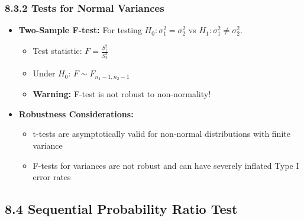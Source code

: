 \subsubsection{8.3.2 Tests for Normal Variances}

\begin{itemize}
	\item \textbf{Two-Sample F-test:} For testing $H_0: \sigma_1^2 = \sigma_2^2$ vs $H_1: \sigma_1^2 \neq \sigma_2^2$.
	\begin{itemize}
		\item Test statistic: $F = \frac{S_1^2}{S_2^2}$
		\item Under $H_0$: $F \sim F_{n_1-1, n_2-1}$
		\item \textbf{Warning:} F-test is not robust to non-normality!
	\end{itemize}
	\item \textbf{Robustness Considerations:}
	\begin{itemize}
		\item t-tests are asymptotically valid for non-normal distributions with finite variance
		\item F-tests for variances are not robust and can have severely inflated Type I error rates
	\end{itemize}
\end{itemize}

\subsection{8.4 Sequential Probability Ratio Test}

